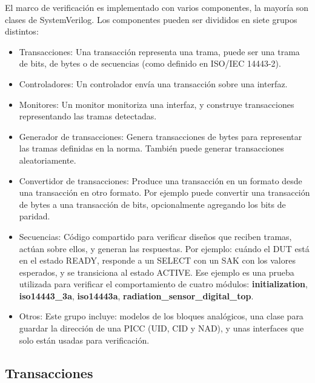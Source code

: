\documentclass[a4paper, twoside, 11pt]{report}
\begin{document}
El marco de verificación es implementado con varios componentes, la mayoría son clases de SystemVerilog. Los componentes pueden ser divididos en siete grupos distintos:

\begin{itemize}
  \item Transacciones: Una transacción representa una trama, puede ser una trama de bits, de bytes o de secuencias (como definido en ISO/IEC 14443-2).
  \item Controladores: Un controlador envía una transacción sobre una interfaz.
  \item Monitores: Un monitor monitoriza una interfaz, y construye transacciones representando las tramas detectadas.
  \item Generador de transacciones: Genera transacciones de bytes para representar las tramas definidas en la norma. También puede generar transacciones aleatoriamente.
  \item Convertidor de transacciones: Produce una transacción en un formato desde una transacción en otro formato. Por ejemplo puede convertir una transacción de bytes a una transacción de bits, opcionalmente agregando los bits de paridad.
  \item Secuencias: Código compartido para verificar diseños que reciben tramas, actúan sobre ellos, y generan las respuestas. Por ejemplo: cuándo el DUT está en el estado READY, responde a un SELECT con un SAK con los valores esperados, y se transiciona al estado ACTIVE. Ese ejemplo es una prueba utilizada para verificar el comportamiento de cuatro módulos: \textbf{initialization}, \textbf{iso14443\_3a}, \textbf{iso14443a}, \textbf{radiation\_sensor\_digital\_top}.
  \item Otros: Este grupo incluye: modelos de los bloques analógicos, una clase para guardar la dirección de una PICC (UID, CID y NAD), y unas interfaces que solo están usadas para verificación.
\end{itemize}

\FloatBarrier
\subsection{Transacciones}
\end{document}
